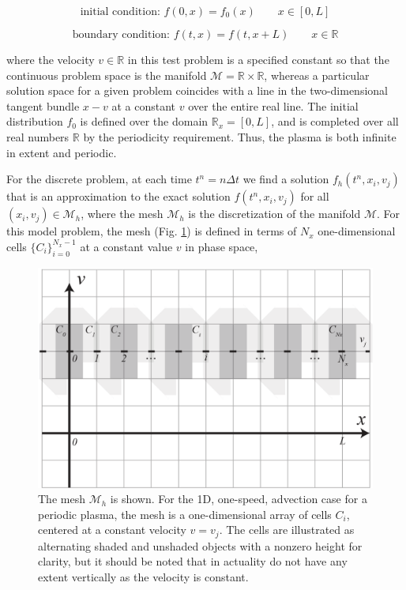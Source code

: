 \documentclass[11pt,titlepage]{report}
\begin{document}
\begin{equation}
\textrm{initial condition: } f(0,x) = f_0(x) \qquad x\in [0,L]
\end{equation}

\begin{equation}
\textrm{boundary condition: }f(t,x) = f(t,x+L) \qquad x\in\mathbb{R}
\end{equation}

\noindent where the velocity $v\in\mathbb{R}$ in this test problem is a specified constant so that the continuous problem space is the manifold $\mathcal{M} = \mathbb{R}\times\mathbb{R}$, whereas a particular solution space for a given problem coincides with a line in the two-dimensional tangent bundle $x-v$ at a constant $v$ over the entire real line. The initial distribution $f_0$ is defined over the domain $\mathbb{R}_x = [0,L]$, and is completed over all real numbers $\mathbb{R}$ by the periodicity requirement. Thus, the plasma is both infinite in extent and periodic.

For the discrete problem, at each time $t^n = n\Delta t$ we find a solution $f_h(t^n,x_i,v_j)$ that is an approximation to the exact solution $f(t^n,x_i,v_j)$ for all $(x_i,v_j)\in\mathcal{M}_h$, where the mesh $\mathcal{M}_h$ is the discretization of the manifold $\mathcal{M}$. For this model problem, the mesh (Fig. \ref{fig:Mh_mesh}) is defined in terms of $N_x$ one-dimensional cells $\{C_i\}_{i = 0}^{N_x-1}$ at a constant value $v$ in phase space,

\begin{figure}[h!]
  \centering
    \includegraphics[scale = 0.25]{graphics/Mh_mesh.eps}
  \caption{The mesh $\mathcal{M}_h$ is shown. For the 1D, one-speed, advection case for a periodic plasma, the mesh is a one-dimensional array of cells $C_i$, centered at a constant velocity $v = v_j$. The cells are illustrated as alternating shaded and unshaded objects with a nonzero height for clarity, but it should be noted that in actuality do not have any extent vertically as the velocity is constant.}
  \label{fig:Mh_mesh}
\end{figure}
\end{document}
